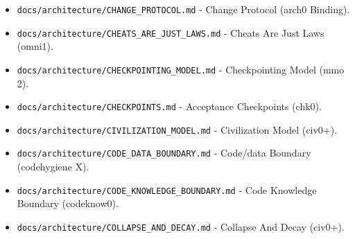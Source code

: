 \documentclass[9pt,a4paper,openany]{book}
\begin{document}
\begin{itemize}
\item \texttt{docs/\allowbreak{}architecture/\allowbreak{}CHANGE\_\allowbreak{}PROTOCOL.\allowbreak{}md} -\allowbreak{} Change Protocol (arch0 Binding).\allowbreak{}
\end{itemize}

\begin{itemize}
\item \texttt{docs/\allowbreak{}architecture/\allowbreak{}CHEATS\_\allowbreak{}ARE\_\allowbreak{}JUST\_\allowbreak{}LAWS.\allowbreak{}md} -\allowbreak{} Cheats Are Just Laws (omni1).\allowbreak{}
\end{itemize}

\begin{itemize}
\item \texttt{docs/\allowbreak{}architecture/\allowbreak{}CHECKPOINTING\_\allowbreak{}MODEL.\allowbreak{}md} -\allowbreak{} Checkpointing Model (mmo 2).\allowbreak{}
\end{itemize}

\begin{itemize}
\item \texttt{docs/\allowbreak{}architecture/\allowbreak{}CHECKPOINTS.\allowbreak{}md} -\allowbreak{} Acceptance Checkpoints (chk0).\allowbreak{}
\end{itemize}

\begin{itemize}
\item \texttt{docs/\allowbreak{}architecture/\allowbreak{}CIVILIZATION\_\allowbreak{}MODEL.\allowbreak{}md} -\allowbreak{} Civilization Model (civ0+).\allowbreak{}
\end{itemize}

\begin{itemize}
\item \texttt{docs/\allowbreak{}architecture/\allowbreak{}CODE\_\allowbreak{}DATA\_\allowbreak{}BOUNDARY.\allowbreak{}md} -\allowbreak{} Code/\allowbreak{}data Boundary (codehygiene X).\allowbreak{}
\end{itemize}

\begin{itemize}
\item \texttt{docs/\allowbreak{}architecture/\allowbreak{}CODE\_\allowbreak{}KNOWLEDGE\_\allowbreak{}BOUNDARY.\allowbreak{}md} -\allowbreak{} Code Knowledge Boundary (codeknow0).\allowbreak{}
\end{itemize}

\begin{itemize}
\item \texttt{docs/\allowbreak{}architecture/\allowbreak{}COLLAPSE\_\allowbreak{}AND\_\allowbreak{}DECAY.\allowbreak{}md} -\allowbreak{} Collapse And Decay (civ0+).\allowbreak{}
\end{itemize}
\end{document}
